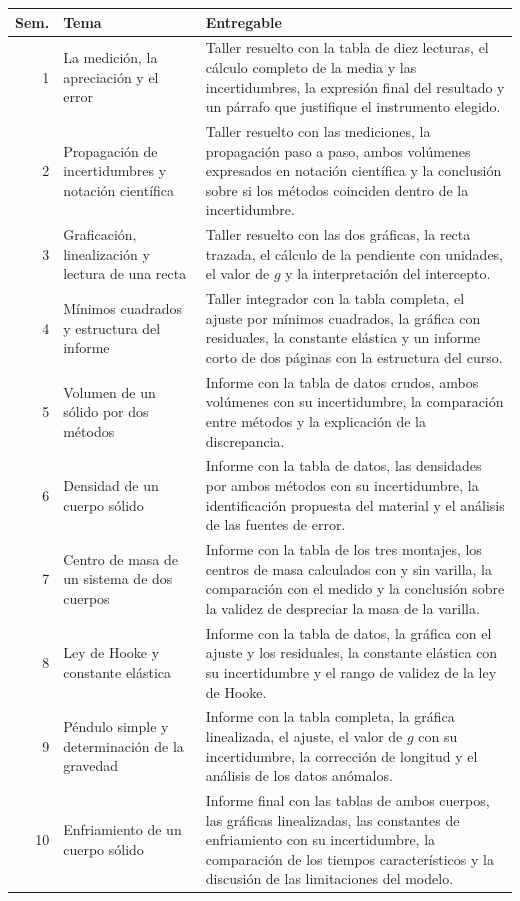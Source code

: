 \documentclass[11pt,a4paper]{article}
\begin{document}
\begin{tabularx}{\linewidth}{@{}r p{4.1cm} X@{}}
\toprule
Sem. & Tema & Entregable\\
\midrule
1 & La medición, la apreciación y el error & Taller resuelto con la tabla de diez lecturas, el cálculo completo de la media y las incertidumbres, la expresión final del resultado y un párrafo que justifique el instrumento elegido. \\
2 & Propagación de incertidumbres y notación científica & Taller resuelto con las mediciones, la propagación paso a paso, ambos volúmenes expresados en notación científica y la conclusión sobre si los métodos coinciden dentro de la incertidumbre. \\
3 & Graficación, linealización y lectura de una recta & Taller resuelto con las dos gráficas, la recta trazada, el cálculo de la pendiente con unidades, el valor de $g$ y la interpretación del intercepto. \\
4 & Mínimos cuadrados y estructura del informe & Taller integrador con la tabla completa, el ajuste por mínimos cuadrados, la gráfica con residuales, la constante elástica y un informe corto de dos páginas con la estructura del curso. \\
5 & Volumen de un sólido por dos métodos & Informe con la tabla de datos crudos, ambos volúmenes con su incertidumbre, la comparación entre métodos y la explicación de la discrepancia. \\
6 & Densidad de un cuerpo sólido & Informe con la tabla de datos, las densidades por ambos métodos con su incertidumbre, la identificación propuesta del material y el análisis de las fuentes de error. \\
7 & Centro de masa de un sistema de dos cuerpos & Informe con la tabla de los tres montajes, los centros de masa calculados con y sin varilla, la comparación con el medido y la conclusión sobre la validez de despreciar la masa de la varilla. \\
8 & Ley de Hooke y constante elástica & Informe con la tabla de datos, la gráfica con el ajuste y los residuales, la constante elástica con su incertidumbre y el rango de validez de la ley de Hooke. \\
9 & Péndulo simple y determinación de la gravedad & Informe con la tabla completa, la gráfica linealizada, el ajuste, el valor de $g$ con su incertidumbre, la corrección de longitud y el análisis de los datos anómalos. \\
10 & Enfriamiento de un cuerpo sólido & Informe final con las tablas de ambos cuerpos, las gráficas linealizadas, las constantes de enfriamiento con su incertidumbre, la comparación de los tiempos característicos y la discusión de las limitaciones del modelo. \\
\bottomrule
\end{tabularx}
\end{document}
